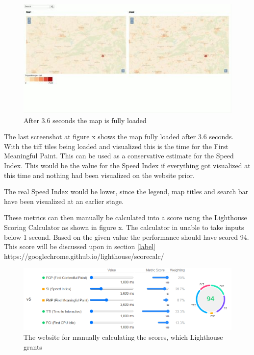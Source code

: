 \begin{figure} [H]
	\centering
	\includegraphics[width=.8\textwidth]{Pictures/ScreenshotLoading3}
	\caption{After 3.6 seconds the map is fully loaded}
	\label{ScreenshotLoading3}
\end{figure}

The last screenshot at figure x shows the map fully loaded after 3.6 seconds. With the tiff tiles being loaded and visualized this is the time for the First Meaningful Paint. This can be used as a conservative estimate for the Speed Index. This would be the value for the Speed Index if everything got visualized at this time and nothing had been visualized on the website prior.

The real Speed Index would be lower, since the legend, map titles and search bar have been visualized at an earlier stage. 

These metrics can then manually be calculated into a score using the Lighthouse Scoring Calculator as shown in figure x. The calculator in unable to take inputs below 1 second. Based on the given value the performance should have scored 94. This score will be discussed upon in section \ref{label}
https://googlechrome.github.io/lighthouse/scorecalc/

\begin{figure} [H]
	\centering
	\includegraphics[width=.9\textwidth]{Pictures/ScoringManual}
	\caption{The website for manually calculating the scores, which Lighthouse grants}
	\label{ScoringManual}
\end{figure}

